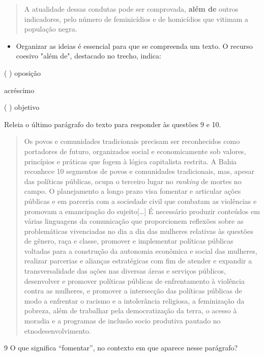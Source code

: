 \begin{itemize}
\begin{quote}
A atualidade dessas condutas pode ser comprovada, \textbf{além de}
outros indicadores, pelo número de feminicídios e de homicídios que
vitimam a população negra.
\end{quote}

\begin{itemize}
\tightlist
\item
  Organizar as ideias é essencial para que se compreenda um texto. O
  recurso coesivo "além de", destacado no trecho, indica:
\end{itemize}

( ) oposição

 acréscimo

( ) objetivo

Releia o último parágrafo do texto para responder às questões 9 e 10.

\begin{quote}
Os povos e comunidades tradicionais precisam ser reconhecidos como
portadores de futuro, organizados social e economicamente sob valores,
princípios e práticas que fogem à lógica capitalista restrita. A Bahia
reconhece 10 segmentos de povos e comunidades tradicionais, mas, apesar
das políticas públicas, ocupa o terceiro lugar no \emph{ranking} de
mortes no campo. O planejamento a longo prazo visa fomentar e articular
ações públicas e em parceria com a sociedade civil que combatam as
violências e promovam a emancipação do sujeito{[}\ldots{}{]} É
necessário produzir conteúdos em várias linguagens da comunicação que
proporcionem reflexões sobre as problemáticas vivenciadas no dia a dia
das mulheres relativas às questões de gênero, raça e classe, promover e
implementar políticas públicas voltadas para a construção da autonomia
econômica e social das mulheres, realizar parcerias e alianças
estratégicas com fim de atender e expandir a transversalidade das ações
nas diversas áreas e serviços públicos, desenvolver e promover políticas
públicas de enfrentamento à violência contra as mulheres, e promover a
intersecção das políticas públicas de modo a enfrentar o racismo e a
intolerância religiosa, a feminização da pobreza, além de trabalhar pela
democratização da terra, o acesso à moradia e a programas de inclusão
socio produtiva pautado no etnodesenvolvimento.
\end{quote}

\num{9} O que significa ``fomentar'', no contexto em que aparece nesse
parágrafo?



\end{itemize}
